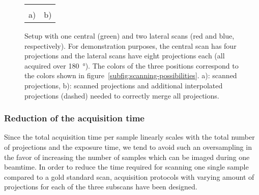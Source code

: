 \begin{figure}%
	\caption{Setup with one central (green) and two lateral scans (red and blue, respectively). For demonstration purposes, the central scan has four projections and the lateral scans have eight projections each (all acquired over \SI{180}{\degree}). The colors of the three positions correspond to the colors shown in figure~\ref{subfig:scanning-possibilities}. a): scanned projections, b): scanned projections and additional interpolated projections (dashed) needed to correctly merge all projections.}%
	\begin{tabular}{cc}%
		\label{subfig:ProjectionSetup}%
	&%
		\label{subfig:ProjectionSetupInterpolate}%
	\\%
	a) & b)\\%
	\end{tabular}%
	\label{fig:projections}%
\end{figure}%

\subsubsection{Reduction of the acquisition time}%
Since the total acquisition time per sample linearly scales with the total number of projections and the exposure time, we tend to avoid such an oversampling in the favor of increasing the number of samples which can be imaged during one beamtime. In order to reduce the time required for scanning one single sample compared to a gold standard scan, acquisition protocols with varying amount of projections for each of the three subscans have been designed.

